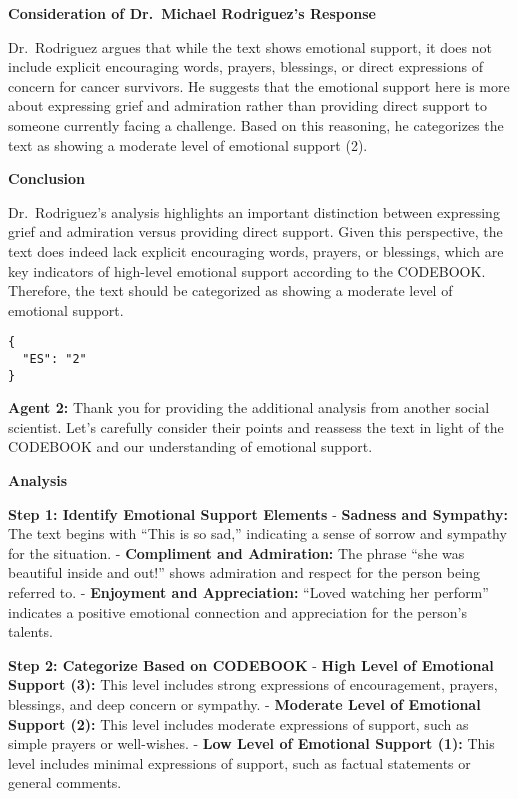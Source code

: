 \textbf{Consideration of Dr.~Michael Rodriguez's Response}

Dr.~Rodriguez argues that while the text shows emotional support, it
does not include explicit encouraging words, prayers, blessings, or
direct expressions of concern for cancer survivors. He suggests that the
emotional support here is more about expressing grief and admiration
rather than providing direct support to someone currently facing a
challenge. Based on this reasoning, he categorizes the text as showing a
moderate level of emotional support (2).

\textbf{Conclusion}

Dr.~Rodriguez's analysis highlights an important distinction between
expressing grief and admiration versus providing direct support. Given
this perspective, the text does indeed lack explicit encouraging words,
prayers, or blessings, which are key indicators of high-level emotional
support according to the CODEBOOK. Therefore, the text should be
categorized as showing a moderate level of emotional support.

\begin{verbatim}
{
  "ES": "2"
}
\end{verbatim}

\textbf{Agent 2:} Thank you for providing the additional analysis from another
social scientist. Let's carefully consider their points and reassess the
text in light of the CODEBOOK and our understanding of emotional
support.

\textbf{Analysis}

\textbf{Step 1: Identify Emotional Support Elements} - \textbf{Sadness
and Sympathy:} The text begins with ``This is so sad,'' indicating a
sense of sorrow and sympathy for the situation. - \textbf{Compliment and
Admiration:} The phrase ``she was beautiful inside and out!'' shows
admiration and respect for the person being referred to. -
\textbf{Enjoyment and Appreciation:} ``Loved watching her perform''
indicates a positive emotional connection and appreciation for the
person's talents.

\textbf{Step 2: Categorize Based on CODEBOOK} - \textbf{High Level of
Emotional Support (3):} This level includes strong expressions of
encouragement, prayers, blessings, and deep concern or sympathy. -
\textbf{Moderate Level of Emotional Support (2):} This level includes
moderate expressions of support, such as simple prayers or well-wishes.
- \textbf{Low Level of Emotional Support (1):} This level includes
minimal expressions of support, such as factual statements or general
comments.

